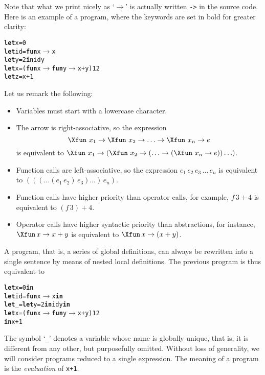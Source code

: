 Note that what we print nicely as `\(\rightarrow\)' is actually
written \texttt{->} in the source code. Here is an example of a
program, where the keywords are set in bold for greater clarity:
\begin{alltt}
\textbf{let} x = 0
\textbf{let} id = \textbf{fun} x \(\rightarrow\) x
\textbf{let} y = 2 \textbf{in} id y
\textbf{let} x = (\textbf{fun} x \(\rightarrow\) \textbf{fun} y \(\rightarrow\) x + y) 1 2
\textbf{let} z = x+1
\end{alltt}
\noindent Let us remark the following:
\begin{itemize}

  \item Variables must start with a lowercase character.

  \item The arrow is right-associative, so the expression
    \begin{equation*}
      \Xfun \,\, x_1 \rightarrow \Xfun \,\, x_2 \rightarrow \ldots
      \rightarrow \Xfun \,\, x_n \rightarrow e
    \end{equation*}
    is equivalent to
     \(\Xfun \,\, x_1 \rightarrow (\Xfun \,\, x_2 \rightarrow
     (\ldots \rightarrow (\Xfun \,\, x_n \rightarrow e)) \ldots)\).

  \item Function calls are left\hyp{}associative, so the
  expression \(e_1 \, e_2 \, e_3 \, \ldots \, e_n\) is equivalent
  to \((((\ldots (e_1 \, e_2) \, e_3) \ldots) \, e_n)\).

  \item Function calls have higher priority than operator calls, for
  example, \(f \, 3 + 4\) is equivalent to \((f \, 3) + 4\).

  \item Operator calls have higher syntactic priority than
  abstractions, for instance, \(\Xfun \, x \rightarrow x + y \) is
  equivalent to \(\Xfun \, x \rightarrow (x + y)\).

\end{itemize}
A program, that is, a series of global definitions, can always be
rewritten into a single sentence by means of nested local
definitions. The previous program is thus equivalent to
\begin{alltt}
\textbf{let} x = 0 \textbf{in}
  \textbf{let} id = \textbf{fun} x \(\rightarrow\) x \textbf{in}
  \textbf{let} _ = \textbf{let} y = 2 \textbf{in} id y \textbf{in}
  \textbf{let} x = (\textbf{fun} x \(\rightarrow\) \textbf{fun} y \(\rightarrow\) x + y) 1 2
\textbf{in} x+1
\end{alltt}
The symbol `\texttt{\_}' denotes a variable whose name is globally
unique, that is, it is different from any other, but purposefully
omitted. Without loss of generality, we will consider programs reduced
to a single expression. The meaning of a program is
the \emph{evaluation} of \texttt{x+1}.

